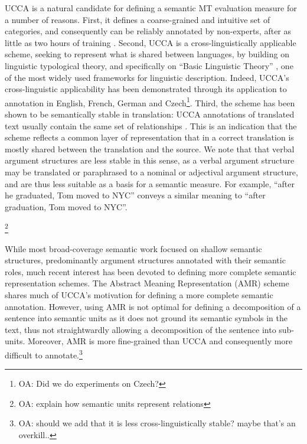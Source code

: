 \documentclass[11pt]{article}
\newcommand{\oa}[1]{\footnote{\color{red}OA: #1}}
\begin{document}
UCCA is a natural candidate for defining a semantic
MT evaluation measure for a number of reasons. 
First, it defines a coarse-grained and intuitive set of categories,
and consequently can be reliably annotated by non-experts, after as little as two hours
of training \cite{marinotti2014}.
Second, UCCA is a cross-linguistically applicable scheme, seeking to represent what is shared between languages,
by building on linguistic typological theory, and specifically on ``Basic Linguistic Theory''
\cite{Dixon:10a,Dixon:10b,Dixon:12}, one of the most widely used frameworks for linguistic description.
Indeed, UCCA's cross-linguistic applicability has been demonstrated through its
application to annotation in English, French, German and Czech\oa{Did we do experiments on Czech?}. 
Third, the scheme has been shown to be semantically stable
in translation: UCCA annotations of translated text usually contain the same set of relationships
\cite{sulem2015conceptual}. This is an indication that the scheme reflects
a common layer of representation that in a correct translation
is mostly shared between the translation and the source. 
We note that that verbal argument structures are less stable in this sense, as a verbal
argument structure may be translated or paraphrased to a nominal or adjectival
argument structure, and are thus less suitable as a basis for a semantic measure.
For example, ``after he graduated, Tom moved to NYC''
conveys a similar meaning to ``after graduation, Tom moved to NYC''. 

\oa{explain how semantic units represent relations}

While most broad-coverage semantic work focused on shallow semantic structures,
predominantly argument structures annotated with their semantic roles, much recent
interest has been devoted to defining more complete semantic representation schemes.
The Abstract Meaning Representation (AMR) scheme \cite{banarescu2013abstract}
shares much of UCCA's motivation for defining a more complete semantic annotation.
However, using AMR is not optimal for defining a decomposition of a sentence into semantic
units as it does not ground its semantic symbols in the text,
thus not straightwardly allowing a decomposition of the sentence into sub-units.
Moreover, AMR is more fine-grained than UCCA and consequently more difficult to annotate.\oa{should we
  add that it is less cross-linguistically stable? maybe that's an overkill..}
\end{document}
